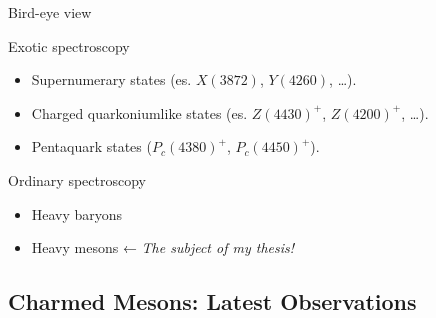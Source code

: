 \documentclass[professionalfonts,aspectratio=169]{beamer}
\begin{document}
\begin{frame}{Bird-eye view}
  \pause
  \begin{block}{Exotic spectroscopy}
    \vspace{0pt}
    \begin{itemize}
    \item Supernumerary states (es. $X(3872)$, $Y(4260)$, \ldots{}).
    \item Charged quarkoniumlike states (es. $Z(4430)^+$, 
      $Z(4200)^+$, \ldots{}).
    \item Pentaquark states ($P_c(4380)^+$, $P_c(4450)^+$).
  \end{itemize}
\end{block}
\pause
\begin{block}{Ordinary spectroscopy}
  \vspace{0pt}
  \begin{itemize}
  \item Heavy baryons
  \item Heavy mesons ← \emph{The subject of my thesis!}
\end{itemize}
  \end{block}
\end{frame}

\subsection{Charmed Mesons: Latest Observations}
\end{document}
